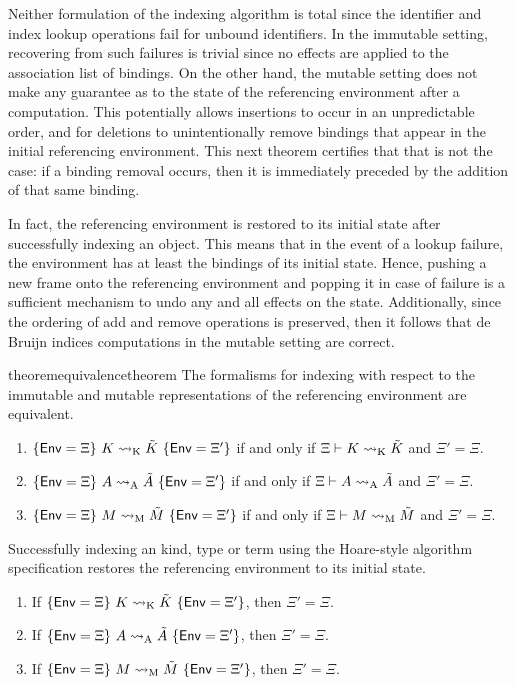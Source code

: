 Neither formulation of the indexing algorithm is total since the identifier and index lookup operations fail for unbound identifiers.
In the immutable setting, recovering from such failures is trivial since no effects are applied to the association list of bindings.
On the other hand, the mutable setting does not make any guarantee as to the state of the referencing environment after a computation.
This potentially allows insertions to occur in an unpredictable order, and for deletions to unintentionally remove bindings that appear in the initial referencing environment.
This next theorem certifies that that is not the case: if a binding removal occurs, then it is immediately preceded by the addition of that same binding.

In fact, the referencing environment is restored to its initial state after successfully indexing an \LF object.
This means that in the event of a lookup failure, the environment has at least the bindings of its initial state.
Hence, pushing a new frame onto the referencing environment and popping it in case of failure is a sufficient mechanism to undo any and all effects on the state.
Additionally, since the ordering of add and remove operations is preserved, then it follows that de Bruijn indices computations in the mutable setting are correct.

\begin{restatable}[Equivalence]{theorem}{equivalencetheorem}\label{theorem:equivalence}
The formalisms for indexing with respect to the immutable and mutable representations of the referencing environment are equivalent.
\begin{enumerate}
\item $\{\mathsf{Env} = \Xi\}\ K \rightsquigarrow_{{\normalfont\text{K}}} \tilde K\ \{\mathsf{Env} = \Xi'\}$ if and only if $\Xi \vdash K \rightsquigarrow_{{\normalfont\text{K}}} \tilde K$ and $\Xi' = \Xi$.
\item $\{\mathsf{Env} = \Xi\}\ A \rightsquigarrow_{{\normalfont\text{A}}} \tilde A\ \{\mathsf{Env} = \Xi'\}$ if and only if $\Xi \vdash A \rightsquigarrow_{{\normalfont\text{A}}} \tilde A$ and $\Xi' = \Xi$.
\item $\{\mathsf{Env} = \Xi\}\ M \rightsquigarrow_{{\normalfont\text{M}}} \tilde M\ \{\mathsf{Env} = \Xi'\}$ if and only if $\Xi \vdash M \rightsquigarrow_{{\normalfont\text{M}}} \tilde M$ and $\Xi' = \Xi$.
\end{enumerate}
\end{restatable}

\begin{corollary}
Successfully indexing an \LF kind, type or term using the Hoare-style algorithm specification restores the referencing environment to its initial state.
\begin{enumerate}
\item If $\{\mathsf{Env} = \Xi\}\ K \rightsquigarrow_{{\normalfont\text{K}}} \tilde K\ \{\mathsf{Env} = \Xi'\}$, then $\Xi' = \Xi$.
\item If $\{\mathsf{Env} = \Xi\}\ A \rightsquigarrow_{{\normalfont\text{A}}} \tilde A\ \{\mathsf{Env} = \Xi'\}$, then $\Xi' = \Xi$.
\item If $\{\mathsf{Env} = \Xi\}\ M \rightsquigarrow_{{\normalfont\text{M}}} \tilde M\ \{\mathsf{Env} = \Xi'\}$, then $\Xi' = \Xi$.
\end{enumerate}
\end{corollary}

